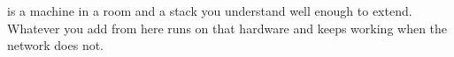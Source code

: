 
 is a machine in a room and a stack you understand
well enough to extend. Whatever you add from here runs on that hardware and keeps
working when the network does not.

